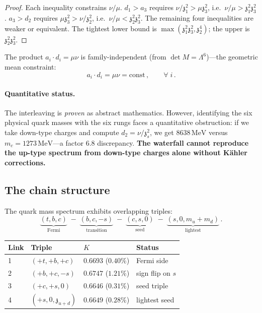 \documentclass[12pt,a4paper]{article}
\newcommand{\MeV}{\,\mathrm{MeV}}
\newcommand{\zch}{\mathfrak{z}}
\begin{document}
\begin{proof}
Each inequality constrains $\nu/\mu$.
$d_1 > a_3$ requires $\nu/\zch_1^2 > \mu\zch_3^2$,
i.e.\ $\nu/\mu > \zch_1^2\zch_3^2$.
$a_3 > d_2$ requires $\mu\zch_3^2 > \nu/\zch_2^2$,
i.e.\ $\nu/\mu < \zch_2^2\zch_3^2$.
The remaining four inequalities are weaker or equivalent.
The tightest lower bound is
$\max(\zch_1^2\zch_3^2, \zch_2^4)$; the upper is
$\zch_2^2\zch_3^2$.
\end{proof}

The product $a_i \cdot d_i = \mu\nu$ is family-independent
(from $\det M = \Lambda^6$)---the geometric mean constraint:
\begin{equation}
  a_i \cdot d_i = \mu\nu = \text{const}\,,
  \qquad\forall\; i\,.
  \label{eq:productrule}
\end{equation}

\paragraph{Quantitative status.}
The interleaving is \emph{proven} as abstract mathematics.
However, identifying the six physical quark masses with the six
rungs faces a quantitative obstruction: if we take down-type
charges and compute $d_2 = \nu/\zch_s^2$, we get $8638\MeV$
versus $m_c = 1273\MeV$---a factor $6.8$ discrepancy.
\textbf{The waterfall cannot reproduce the up-type spectrum from
down-type charges alone without K\"ahler corrections.}


\subsection{The chain structure}

The quark mass spectrum exhibits overlapping triples:
\begin{equation}
  \underbrace{(t,b,c)}_{\text{Fermi}} \;-\;
  \underbrace{(b,c,-s)}_{\text{transition}} \;-\;
  \underbrace{(c,s,0)}_{\text{seed}} \;-\;
  \underbrace{(s,0,m_u{+}m_d)}_{\text{lightest}}\,.
  \label{eq:chain}
\end{equation}

\begin{center}
\begin{tabular}{llll}
\hline
Link & Triple & $K$ & Status \\
\hline
1 & $(+t, +b, +c)$ & $0.6693$ ($0.40\%$) & Fermi side \\
2 & $(+b, +c, -s)$ & $0.6747$ ($1.21\%$) & sign flip on $s$ \\
3 & $(+c, +s, 0)$ & $0.6646$ ($0.31\%$) & seed triple \\
4 & $(+s, 0, \zch_{u+d})$ & $0.6649$ ($0.28\%$) & lightest seed \\
\hline
\end{tabular}
\end{center}
\end{document}
